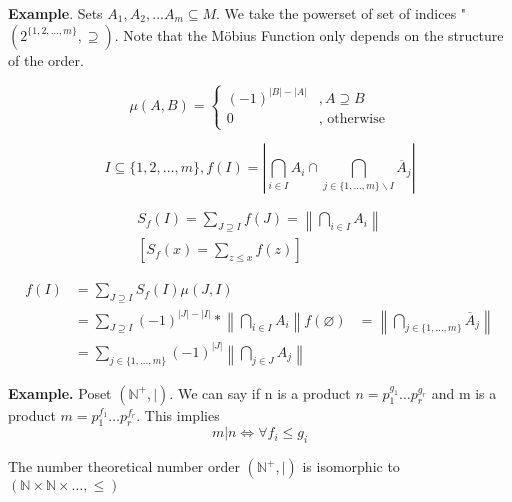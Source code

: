 


\textbf{Example}.
Sets $A_1, A_2, \ldots A_m \subseteq M$. We take the powerset of set of indices "$(2^{\{1,2, \ldots , m\}}, \supseteq)$. 
Note that the Möbius Function only depends on the structure of the order. 

\[
  \mu (A,B) = \begin{cases} 
    (-1)^{|B| - |A|} &, A\supseteq B\\ 
    0                & \text{, otherwise}
  \end{cases}
\]

\[
    I \subseteq \{ 1,2, \ldots, m\}, 
    f(I) = | \bigcap_{i\in I} A_i \cap 
      \bigcap_{j \in \{1,\ldots ,m\} \backslash I} \overline{A}_j |
\]

\begin{gather*}
  S_f(I) = \sum_{J \supseteq I} f(J) = \left\| \bigcap_{i\in I} A_i  \right\| \\
  \left[ S_f(x) = \sum_{z\leq x} f(z) \right]
\end{gather*}

\begin{align*}
  f(I) &= \sum_{J \supseteq I} S_f(I) \mu(J,I) \\
    &= \sum_{J \supseteq I} (-1)^{|J| - |I|} * \left\| \bigcap_{i\in I} A_i \right\|
  f(\varnothing) &= \left\| \bigcap_{j \in \{1,\ldots ,m\}} \overline{A}_j \right\| \\
    &= \sum_{j \in \{1,\ldots ,m\}} (-1)^{|J|} \left\| \bigcap_{j \in J} A_j \right\|
\end{align*}

\textbf{Example.}
Poset $(\mathbb{N}^{+}, \mid)$.
We can say if n is a product $n = p_1^{g_1} \ldots p_r^{g_r}$ and m is a product $m = p_1^{f_1} \ldots p_r^{f_r}$. This implies 
\[
    m|n \iff \forall f_i \leq g_i
\]

The number theoretical number order $(\mathbb{N}^{+}, \mid)$ is isomorphic to $(\mathbb{N} \times \mathbb{N} \times \ldots , \leq)$

